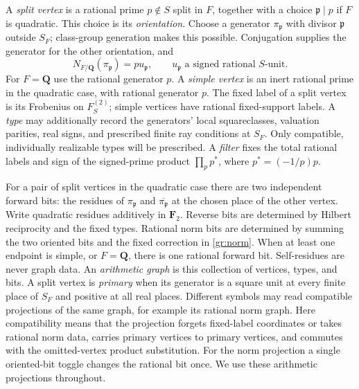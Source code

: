 A \emph{split vertex} is a rational prime $p\notin S$ split in $F$, together
with a choice $\mathfrak p\mid p$ if $F$ is quadratic.  This choice is its
\emph{orientation}.  Choose a generator $\pi_{\mathfrak p}$ with divisor
$\mathfrak p$ outside $S_F$; class-group generation makes this possible.
Conjugation supplies the generator for the other orientation, and
\begin{equation}\label{gr:norm}
 N_{F/\mathbf Q}(\pi_{\mathfrak p})=p u_{\mathfrak p},
 \qquad u_{\mathfrak p}\text{ a signed rational }S\text{-unit}.
\end{equation}
For $F=\mathbf Q$ use the rational generator $p$.  A \emph{simple vertex}
is an inert rational prime in the quadratic case, with rational generator
$p$.  The fixed label of a split vertex is its Frobenius on $F_S^{(2)}$;
simple vertices have rational fixed-support labels.  A \emph{type} may
additionally record the generators' local squareclasses, valuation parities,
real signs, and prescribed finite ray conditions at $S_F$.  Only compatible,
individually realizable types will be prescribed.  A \emph{filter} fixes the
total rational labels and sign of the signed-prime product
$\prod_p p^*$, where $p^*=(-1/p)p$.

For a pair of split vertices in the quadratic case there are two independent
forward bits: the residues of $\pi_{\mathfrak p}$ and
$\overline{\pi_{\mathfrak p}}$ at the chosen place of the other vertex.
Write quadratic residues additively in $\mathbf F_2$.  Reverse bits are
determined by Hilbert reciprocity and the fixed types.  Rational norm bits
are determined by summing the two oriented bits and the fixed correction
in \eqref{gr:norm}.  When at least one endpoint is simple, or $F=\mathbf Q$,
there is one rational forward bit.  Self-residues are never graph data.
An \emph{arithmetic graph} is this collection of vertices, types, and bits.
A split vertex is \emph{primary} when its generator is a square unit at
every finite place of $S_F$ and positive at all real places.
Different symbols may read compatible projections of the same graph, for
example its rational norm graph.  Here compatibility means that the
projection forgets fixed-label coordinates or takes rational norm data,
carries primary vertices to primary vertices, and commutes with the
omitted-vertex product substitution.  For the norm projection a single
oriented-bit toggle changes the rational bit once.  We use these arithmetic
projections throughout.

